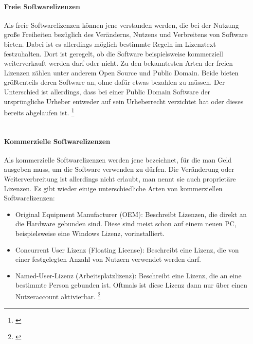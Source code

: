 \documentclass[titlepage,12pt,twoside]{article}
\begin{document}
\paragraph{Freie Softwarelizenzen}
\hfill \break
\hfill \break
Als freie Softwarelizenzen können jene verstanden werden, die bei der Nutzung große Freiheiten bezüglich des 
Veränderns, Nutzens und Verbreitens von Software bieten. Dabei ist es allerdings möglich bestimmte Regeln im 
Lizenztext festzuhalten. Dort ist geregelt, ob die Software beispielsweise kommerziell weiterverkauft werden 
darf oder nicht. Zu den bekanntesten Arten der freien Lizenzen zählen unter anderem Open Source und Public 
Domain. Beide bieten größtenteils deren Software an, ohne dafür etwas bezahlen zu müssen. Der Unterschied ist 
allerdings, dass bei einer Public Domain Software der ursprüngliche Urheber entweder auf sein Urheberrecht 
verzichtet hat oder dieses bereits abgelaufen ist. \footnote{\cite{Simpleclub24}} \\
\\
\paragraph{Kommerzielle Softwarelizenzen}
\hfill \break
\hfill \break
Als kommerzielle Softwarelizenzen werden jene bezeichnet, für die man Geld ausgeben muss, um die Software 
verwenden zu dürfen. Die Veränderung oder Weiterverbreitung ist allerdings nicht erlaubt, man nennt sie auch 
proprietäre Lizenzen. Es gibt wieder einige unterschiedliche Arten von kommerziellen Softwarelizenzen: \\
\begin{itemize}
	\item Original Equipment Manufacturer (OEM): Beschreibt Lizenzen, die direkt an die Hardware gebunden 
	sind. Diese sind meist schon auf einem neuen PC, beispielsweise eine Windows Lizenz, vorinstalliert.
	\item Concurrent User Lizenz (Floating License): Beschreibt eine Lizenz, die von einer festgelegten 
	Anzahl von Nutzern verwendet werden darf.
	\item Named-User-Lizenz (Arbeitsplatzlizenz): Beschreibt eine Lizenz, die an eine bestimmte Person 
	gebunden ist. Oftmals ist diese Lizenz dann nur über einen Nutzeraccount aktivierbar. \footnote{\cite{Simpleclub25}}
\end{itemize}
\hfill \break
\end{document}
